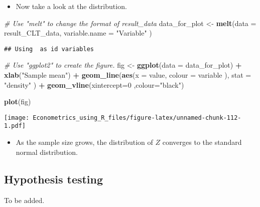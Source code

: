 \documentclass[]{book}
\newenvironment{Shaded}{\begin{snugshade}}{\end{snugshade}}
\newcommand{\KeywordTok}[1]{\textcolor[rgb]{0.13,0.29,0.53}{\textbf{#1}}}
\newcommand{\DataTypeTok}[1]{\textcolor[rgb]{0.13,0.29,0.53}{#1}}
\newcommand{\DecValTok}[1]{\textcolor[rgb]{0.00,0.00,0.81}{#1}}
\newcommand{\StringTok}[1]{\textcolor[rgb]{0.31,0.60,0.02}{#1}}
\newcommand{\CommentTok}[1]{\textcolor[rgb]{0.56,0.35,0.01}{\textit{#1}}}
\newcommand{\OperatorTok}[1]{\textcolor[rgb]{0.81,0.36,0.00}{\textbf{#1}}}
\newcommand{\NormalTok}[1]{#1}
\providecommand{\tightlist}{%
  \setlength{\itemsep}{0pt}\setlength{\parskip}{0pt}}
\begin{document}
\begin{itemize}
\tightlist
\item
  Now take a look at the distribution.
\end{itemize}

\begin{Shaded}
\begin{Highlighting}[]
\CommentTok{# Use "melt" to change the format of result_data}
\NormalTok{data_for_plot <-}\StringTok{ }\KeywordTok{melt}\NormalTok{(}\DataTypeTok{data =}\NormalTok{ result_CLT_data, }\DataTypeTok{variable.name =} \StringTok{"Variable"}\NormalTok{ )}
\end{Highlighting}
\end{Shaded}

\begin{verbatim}
## Using  as id variables
\end{verbatim}

\begin{Shaded}
\begin{Highlighting}[]
\CommentTok{# Use "ggplot2" to create the figure.}
\NormalTok{fig <-}\StringTok{ }
\StringTok{  }\KeywordTok{ggplot}\NormalTok{(}\DataTypeTok{data =}\NormalTok{ data_for_plot) }\OperatorTok{+}
\StringTok{  }\KeywordTok{xlab}\NormalTok{(}\StringTok{"Sample mean"}\NormalTok{) }\OperatorTok{+}\StringTok{ }
\StringTok{  }\KeywordTok{geom_line}\NormalTok{(}\KeywordTok{aes}\NormalTok{(}\DataTypeTok{x =}\NormalTok{ value, }\DataTypeTok{colour =}\NormalTok{ variable ),   }\DataTypeTok{stat =} \StringTok{"density"}\NormalTok{ ) }\OperatorTok{+}\StringTok{ }
\StringTok{  }\KeywordTok{geom_vline}\NormalTok{(}\DataTypeTok{xintercept=}\DecValTok{0}\NormalTok{ ,}\DataTypeTok{colour=}\StringTok{"black"}\NormalTok{)}

\KeywordTok{plot}\NormalTok{(fig)}
\end{Highlighting}
\end{Shaded}

\texttt{[image: Econometrics\_using\_R\_files/figure-latex/unnamed-chunk-112-1.pdf]}

\begin{itemize}
\tightlist
\item
  As the sample size grows, the distribution of \(Z\) converges to the
  standard normal distribution.
\end{itemize}

\subsection{Hypothesis testing}\label{hypothesis-testing-1}

To be added.
\end{document}
